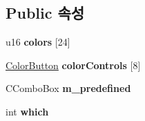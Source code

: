 \subsection*{Public 속성}
\begin{DoxyCompactItemize}
\item 
\mbox{\label{class_g_b_color_dlg_a24de2e906e28d7b4a006d68d6c8afeee}} 
u16 {\bfseries colors} \mbox{[}24\mbox{]}
\item 
\mbox{\label{class_g_b_color_dlg_a7b80bc0f290c7f26e84283dc7c457240}} 
\mbox{\hyperlink{class_color_button}{Color\+Button}} {\bfseries color\+Controls} \mbox{[}8\mbox{]}
\item 
\mbox{\label{class_g_b_color_dlg_abd7ea64ca037d12cec0615ef7872c66b}} 
C\+Combo\+Box {\bfseries m\+\_\+predefined}
\item 
\mbox{\label{class_g_b_color_dlg_a8f7bbf1c4a4ffe4a6c57454b9087ff28}} 
int {\bfseries which}
\end{DoxyCompactItemize}
